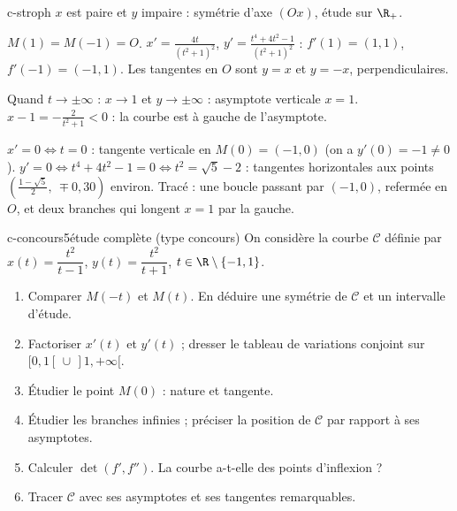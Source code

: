 \begin{corrige}{c-stroph}
 $x$ est paire et $y$ impaire : symétrie d'axe $(Ox)$, étude sur $\R_+$.

 $M(1)=M(-1)=O$. $x'=\frac{4t}{(t^2+1)^2}$, $y'=\frac{t^4+4t^2-1}{(t^2+1)^2}$ : $f'(1)=(1,1)$, $f'(-1)=(-1,1)$. Les tangentes en $O$ sont $y=x$ et $y=-x$, perpendiculaires.

 Quand $t\to\pm\infty$ : $x\to1$ et $y\to\pm\infty$ : asymptote verticale $x=1$. $x-1=-\frac2{t^2+1}<0$ : la courbe est à gauche de l'asymptote.

 $x'=0\iff t=0$ : tangente verticale en $M(0)=(-1,0)$ (on a $y'(0)=-1\neq0$). $y'=0\iff t^4+4t^2-1=0\iff t^2=\sqrt5-2$ : tangentes horizontales aux points $\left(\frac{1-\sqrt5}2,\ \mp0{,}30\right)$ environ. Tracé : une boucle passant par $(-1,0)$, refermée en $O$, et deux branches qui longent $x=1$ par la gauche.
\end{corrige}

\begin{exo}{c-concours}{5}{étude complète (type concours)}
On considère la courbe $\mathcal C$ définie par $x(t)=\dfrac{t^2}{t-1}$, $y(t)=\dfrac{t^2}{t+1}$, $t\in\R\setminus\{-1,1\}$.
\begin{enumerate}
\item Comparer $M(-t)$ et $M(t)$. En déduire une symétrie de $\mathcal C$ et un intervalle d'étude.
\item Factoriser $x'(t)$ et $y'(t)$ ; dresser le tableau de variations conjoint sur $[0,1[\,\cup\,]1,+\infty[$.
\item Étudier le point $M(0)$ : nature et tangente.
\item Étudier les branches infinies ; préciser la position de $\mathcal C$ par rapport à ses asymptotes.
\item Calculer $\det(f',f'')$. La courbe a-t-elle des points d'inflexion ?
\item Tracer $\mathcal C$ avec ses asymptotes et ses tangentes remarquables.
\end{enumerate}
\end{exo}

